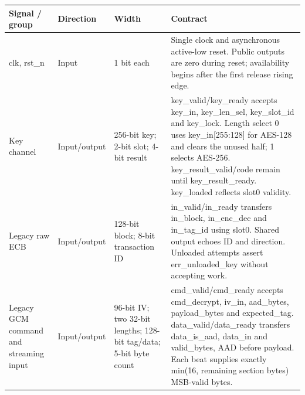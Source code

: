 \documentclass[11pt,a4paper]{article}
\begin{document}
{\small\renewcommand{\arraystretch}{1.18}\begin{longtable}{@{}L{0.21\textwidth}|L{0.12\textwidth}|L{0.12\textwidth}|L{0.45\textwidth}@{}}\toprule

\textbf{Signal /\allowbreak{} group} & \textbf{Direction} & \textbf{Width} & \textbf{Contract}\\\midrule\endhead

clk,\allowbreak{} rst\_\allowbreak{}n & Input & 1 bit each & Single clock and asynchronous active-low reset. Public outputs are zero during reset; availability begins after the first release rising edge.\\[2pt]\hline

Key channel & Input/\allowbreak{}output & 256-bit key; 2-bit slot; 4-bit result & key\_\allowbreak{}valid/\allowbreak{}key\_\allowbreak{}ready accepts key\_\allowbreak{}in,\allowbreak{} key\_\allowbreak{}len\_\allowbreak{}sel,\allowbreak{} key\_\allowbreak{}slot\_\allowbreak{}id and key\_\allowbreak{}lock. Length select 0 uses key\_\allowbreak{}in[\allowbreak{}255:128]\allowbreak{} for AES-128 and clears the unused half; 1 selects AES-256. key\_\allowbreak{}result\_\allowbreak{}valid/\allowbreak{}code remain until key\_\allowbreak{}result\_\allowbreak{}ready. key\_\allowbreak{}loaded reflects slot0 validity.\\[2pt]\hline

Legacy raw ECB & Input/\allowbreak{}output & 128-bit block; 8-bit transaction ID & in\_\allowbreak{}valid/\allowbreak{}in\_\allowbreak{}ready transfers in\_\allowbreak{}block,\allowbreak{} in\_\allowbreak{}enc\_\allowbreak{}dec and in\_\allowbreak{}tag\_\allowbreak{}id using slot0. Shared output echoes ID and direction. Unloaded attempts assert err\_\allowbreak{}unloaded\_\allowbreak{}key without accepting work.\\[2pt]\hline

Legacy GCM command and streaming input & Input/\allowbreak{}output & 96-bit IV; two 32-bit lengths; 128-bit tag/\allowbreak{}data; 5-bit byte count & cmd\_\allowbreak{}valid/\allowbreak{}cmd\_\allowbreak{}ready accepts cmd\_\allowbreak{}decrypt,\allowbreak{} iv\_\allowbreak{}in,\allowbreak{} aad\_\allowbreak{}bytes,\allowbreak{} payload\_\allowbreak{}bytes and expected\_\allowbreak{}tag. data\_\allowbreak{}valid/\allowbreak{}data\_\allowbreak{}ready transfers data\_\allowbreak{}is\_\allowbreak{}aad,\allowbreak{} data\_\allowbreak{}in and valid\_\allowbreak{}bytes,\allowbreak{} AAD before payload. Each beat supplies exactly min(\allowbreak{}16,\allowbreak{} remaining section bytes)\allowbreak{} MSB-valid bytes.\\[2pt]\hline


\end{longtable}}
\end{document}
